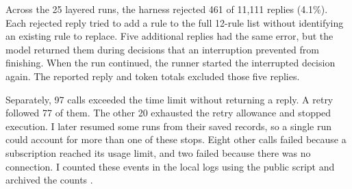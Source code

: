 Across the 25 layered runs, the harness rejected 461 of 11,111 replies (4.1\%). Each rejected reply tried to add a rule to the full 12-rule list without identifying an existing rule to replace. Five additional replies had the same error, but the model returned them during decisions that an interruption prevented from finishing. When the run continued, the runner started the interrupted decision again. The reported reply and token totals excluded those five replies.

Separately, 97 calls exceeded the time limit without returning a reply. A retry followed 77 of them. The other 20 exhausted the retry allowance and stopped execution. I later resumed some runs from their saved records, so a single run could account for more than one of these stops. Eight other calls failed because a subscription reached its usage limit, and two failed because there was no connection. I counted these events in the local logs using the public script  and archived the counts \citep{dai2026logcounts,dai2026wholeverify}.
